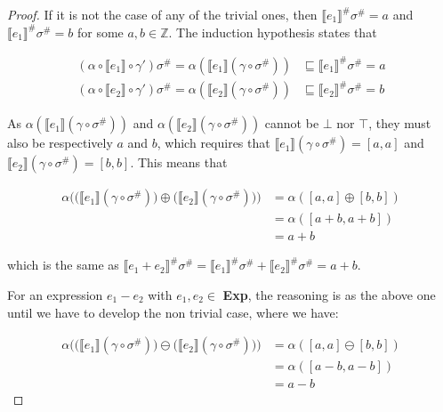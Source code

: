 \documentclass{article}
\begin{document}
\begin{proof}
  If it is not the case of any of the trivial ones, then 
  $\llbracket e_1 \rrbracket^\# \sigma^\# = a$ and 
  $\llbracket e_1 \rrbracket^\# \sigma^\# = b$ for some 
  $a, b \in \mathbb{Z}$. The induction hypothesis states that 
  
  \begin{align*}
    (
      \alpha \circ \llbracket e_1\rrbracket \circ \gamma'
    ) \sigma^\# = 
    \alpha(\llbracket e_1\rrbracket(\gamma \circ \sigma^\#)) 
      &\sqsubseteq \llbracket e_1 \rrbracket^\# \sigma^\# = a\\
    (
      \alpha \circ \llbracket e_2\rrbracket \circ \gamma'
    ) \sigma^\# = 
    \alpha(\llbracket e_2\rrbracket(\gamma \circ \sigma^\#))
      &\sqsubseteq \llbracket e_2 \rrbracket^\# \sigma^\# = b
  \end{align*}

  As $\alpha(\llbracket e_1\rrbracket(\gamma \circ \sigma^\#))$
  and $\alpha(\llbracket e_2\rrbracket(\gamma \circ \sigma^\#))$
  cannot be $\bot$ nor $\top$, they must also be respectively $a$
  and $b$, which requires that 
  $\llbracket e_1\rrbracket(\gamma \circ \sigma^\#) = [a,a]$ and 
  $\llbracket e_2\rrbracket(\gamma \circ \sigma^\#) = [b,b]$. This 
  means that 

  \begin{align*}
    \alpha \Bigg(
      \Big(\llbracket e_1\rrbracket(\gamma \circ \sigma^\#)\Big) 
      \oplus
      \Big(\llbracket e_2\rrbracket(\gamma \circ \sigma^\#)\Big)
    \Bigg) &= \alpha([a,a] \oplus [b, b]) \\
      &= \alpha([a + b,a + b]) \\
      &= a + b
  \end{align*}

  which is the same as 
  $\llbracket e_1 + e_2 \rrbracket^\# \sigma^\# = 
  \llbracket e_1 \rrbracket^\# \sigma^\# 
  + \llbracket e_2 \rrbracket^\# \sigma^\# 
  = a + b$.

  For an expression $e_1 - e_2$ with $e_1, e_2 \in$
  \textbf{Exp}, the reasoning is as the above one until 
  we have to develop the non trivial case, where we have:

  \begin{align*}
    \alpha \Bigg(
      \Big(\llbracket e_1\rrbracket(\gamma \circ \sigma^\#)\Big) 
      \ominus
      \Big(\llbracket e_2\rrbracket(\gamma \circ \sigma^\#)\Big)
    \Bigg) &= \alpha([a,a] \ominus [b, b]) \\
      &= \alpha([a - b,a - b]) \\
      &= a - b
  \end{align*}


\end{proof}
\end{document}

